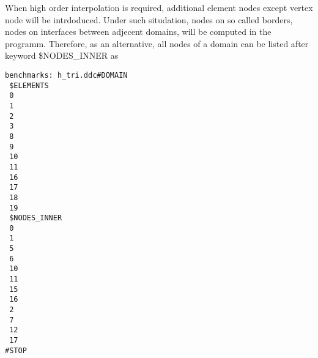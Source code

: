 When high order interpolation is required,  additional element nodes except vertex node will be intrdoduced.
Under such situdation, nodes on so called borders, nodes on interfaces between adjecent domains,
 will be computed in the programm. Therefore, as an alternative, all nodes of a domain can be listed
 after keyword \mbox{\$NODES\_INNER} as
\begin{verbatim}
benchmarks: h_tri.ddc#DOMAIN
 $ELEMENTS
 0
 1
 2
 3
 8
 9
 10
 11
 16
 17
 18
 19
 $NODES_INNER
 0
 1
 5
 6
 10
 11
 15
 16
 2
 7
 12
 17
#STOP
\end{verbatim}

\newpage

